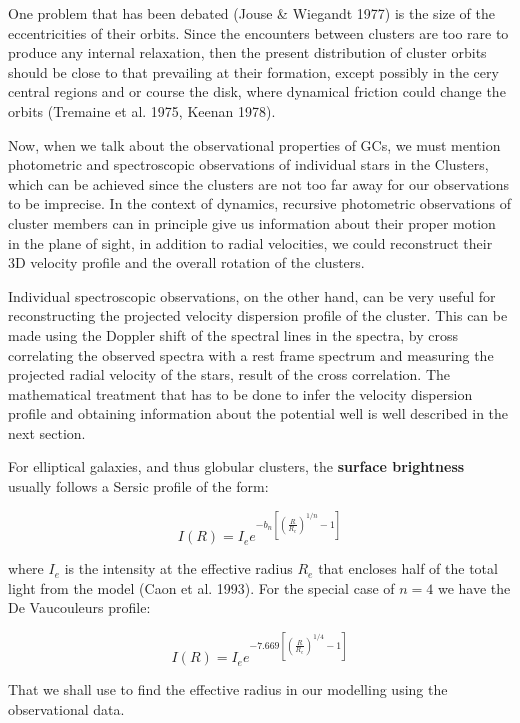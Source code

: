 One problem that has been debated (Jouse \& Wiegandt 1977) is the size of the eccentricities of their orbits. Since the encounters between clusters are too rare to produce any internal relaxation, then the present distribution of cluster orbits should be close to that prevailing at their formation, except possibly in the cery central regions and or course the disk, where dynamical friction could change the orbits (Tremaine et al. 1975, Keenan 1978).

Now, when we talk about the observational properties of GCs, we must mention photometric and spectroscopic observations of individual stars in the Clusters, which can be achieved since the clusters are not too far away for our observations to be imprecise. In the context of dynamics, recursive photometric observations of cluster members can in principle give us information about their proper motion in the plane of sight, in addition to radial velocities, we could reconstruct their 3D velocity profile and the overall rotation of the clusters. 

Individual spectroscopic observations, on the other hand, can be very useful for reconstructing the projected velocity dispersion profile of the cluster. This can be made using the Doppler shift of the spectral lines in the spectra, by cross correlating the observed spectra with a rest frame spectrum and measuring the projected radial velocity of the stars, result of the cross correlation. The mathematical treatment that has to be done to infer the velocity dispersion profile and obtaining information about the potential well is well described in the next section.

For elliptical galaxies, and thus globular clusters, the \textbf{surface brightness} usually follows a Sersic profile of the form: 

\begin{equation}
I(R)=I_{e}e^{-b_{n}\left[\left(\frac{R}{R_{e}}\right)^{1/n}-1\right]}
\end{equation}

where $I_{e}$ is the intensity at the effective radius $R_{e}$ that encloses half of the total light from the model (Caon et al. 1993). For the special case of $n=4$ we have the De Vaucouleurs profile:

\begin{equation}
I(R)=I_{e}e^{-7.669\left[\left(\frac{R}{R_{e}}\right)^{1/4}-1\right]}
\end{equation}

That we shall use to find the effective radius in our modelling using the observational data.

